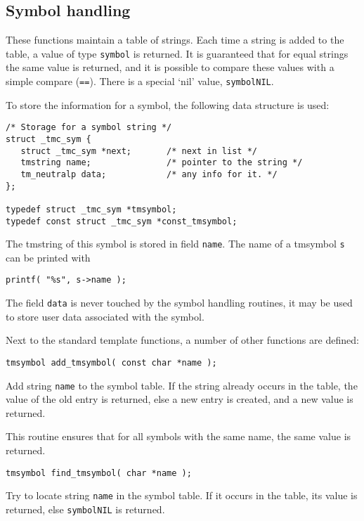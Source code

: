 \subsection{Symbol handling}
\label{s.tmsymbol}
These functions maintain a table of strings.
Each time a string is added to the table,
a value of type \texttt{symbol} is returned.
It is guaranteed that for equal strings the same value is returned,
and it is possible to compare these values with a simple compare (\texttt{==}).
There is a special `nil' value, \texttt{symbolNIL}.
\par
To store the information for a symbol, the following data structure is used:
\begin{verbatim}
/* Storage for a symbol string */
struct _tmc_sym {
   struct _tmc_sym *next;       /* next in list */
   tmstring name;               /* pointer to the string */
   tm_neutralp data;            /* any info for it. */
};

typedef struct _tmc_sym *tmsymbol;
typedef const struct _tmc_sym *const_tmsymbol;
\end{verbatim}
The tmstring of this symbol is stored in field \verb+name+.
The name of a tmsymbol \verb+s+ can be printed with
\begin{showfile}
\begin{verbatim}
printf( "%s", s->name );
\end{verbatim}
\end{showfile}
The field \verb+data+ is never touched by the symbol handling routines,
it may be used to store user data associated with the symbol.
\par
Next to the standard template functions, a number of other functions
are defined:
\begin{verbatim}
tmsymbol add_tmsymbol( const char *name );
\end{verbatim}
\begin{desc}
Add string \texttt{name} to the symbol table.
If the string already occurs in the table, the value of the old
entry is returned, else a new entry is created,
and a new value is returned.
\par
This routine ensures that for all symbols with the same name,
the same value is returned.
\end{desc}
\begin{verbatim}
tmsymbol find_tmsymbol( char *name );
\end{verbatim}
\begin{desc}
Try to locate string \texttt{name} in the symbol table.
If it occurs in the table, its value is returned,
else \texttt{symbolNIL} is returned.
\end{desc}
